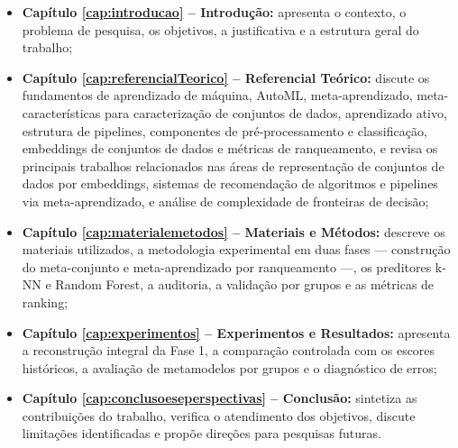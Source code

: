 \begin{itemize}
    \item \textbf{Capítulo \ref{cap:introducao} – Introdução:} apresenta o contexto, o problema de pesquisa, os objetivos, a justificativa e a estrutura geral do trabalho;

    \item \textbf{Capítulo \ref{cap:referencialTeorico} – Referencial Teórico:} discute os fundamentos de aprendizado de máquina, AutoML, meta-aprendizado, meta-características para caracterização de conjuntos de dados, aprendizado ativo, estrutura de pipelines, componentes de pré-processamento e classificação, embeddings de conjuntos de dados e métricas de ranqueamento, e revisa os principais trabalhos relacionados nas áreas de representação de conjuntos de dados por embeddings, sistemas de recomendação de algoritmos e pipelines via meta-aprendizado, e análise de complexidade de fronteiras de decisão;

    \item \textbf{Capítulo \ref{cap:materialemetodos} – Materiais e Métodos:} descreve os materiais utilizados, a metodologia experimental em duas fases — construção do meta-conjunto e meta-aprendizado por ranqueamento —, os preditores k-NN e Random Forest, a auditoria, a validação por grupos e as métricas de ranking;

    \item \textbf{Capítulo \ref{cap:experimentos} – Experimentos e Resultados:} apresenta a reconstrução integral da Fase 1, a comparação controlada com os escores históricos, a avaliação de metamodelos por grupos e o diagnóstico de erros;

    \item \textbf{Capítulo \ref{cap:conclusoeseperspectivas} – Conclusão:} sintetiza as contribuições do trabalho, verifica o atendimento dos objetivos, discute limitações identificadas e propõe direções para pesquisas futuras.
\end{itemize}
